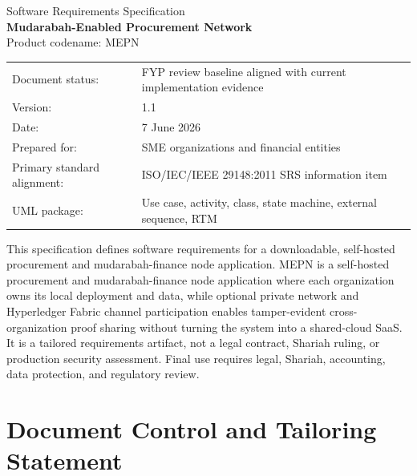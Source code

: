 \documentclass[11pt,a4paper]{article}
\newcommand{\systemshort}{MEPN}
\begin{document}
\begin{titlepage}
\centering
\vspace*{1.0cm}
{\Large Software Requirements Specification\\[0.4cm]}
{\huge \textbf{Mudarabah-Enabled Procurement Network}\\[0.35cm]}
{\Large Product codename: \systemshort{}\\[0.8cm]}
\vspace{0.8cm}
\begin{tabular}{ll}
Document status: & FYP review baseline aligned with current implementation evidence \\
Version: & 1.1 \\
Date: & 7 June 2026 \\
Prepared for: & SME organizations and financial entities \\
Primary standard alignment: & ISO/IEC/IEEE 29148:2011 SRS information item \\
UML package: & Use case, activity, class, state machine, external sequence, RTM \\
\end{tabular}
\vfill
\begin{minipage}{0.86\textwidth}
\small
This specification defines software requirements for a downloadable, self-hosted procurement and mudarabah-finance node application. MEPN is a self-hosted procurement and mudarabah-finance node application where each organization owns its local deployment and data, while optional private network and Hyperledger Fabric channel participation enables tamper-evident cross-organization proof sharing without turning the system into a shared-cloud SaaS. It is a tailored requirements artifact, not a legal contract, Shariah ruling, or production security assessment. Final use requires legal, Shariah, accounting, data protection, and regulatory review.
\end{minipage}
\vfill
\end{titlepage}

\tableofcontents
\listoffigures
\listoftables
\clearpage
{}

\section{Document Control and Tailoring Statement}
\end{document}
